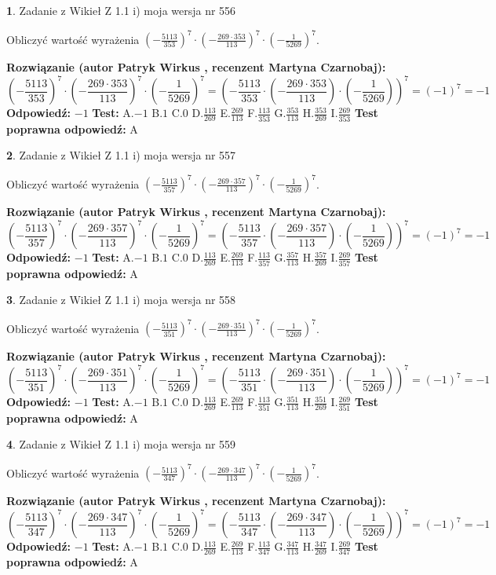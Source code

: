 \documentclass[12pt, a4paper]{article}
\theoremstyle{definition} %
\newtheorem{zad}{}
\newcommand{\zadStart}[1]{\begin{zad}#1\newline}
\newcommand{\zadStop}{\end{zad}}
\newcommand{\rozwStart}[2]{\noindent \textbf{Rozwiązanie (autor #1 , recenzent #2): }\newline}
\newcommand{\rozwStop}{\newline}
\newcommand{\odpStart}{\noindent \textbf{Odpowiedź:}\newline}
\newcommand{\odpStop}{\newline}
\newcommand{\testStart}{\noindent \textbf{Test:}\newline}
\newcommand{\testStop}{\newline}
\newcommand{\kluczStart}{\noindent \textbf{Test poprawna odpowiedź:}\newline}
\newcommand{\kluczStop}{\newline}
\begin{document}
\zadStart{Zadanie z Wikieł Z 1.1 i) moja wersja nr 556}

Obliczyć wartość wyrażenia $(-\frac{5113}{353})^{7} \cdot (-\frac{269 \cdot 353}{113})^{7} \cdot (-\frac{1}{5269})^{7}$.
\zadStop
\rozwStart{Patryk Wirkus}{Martyna Czarnobaj}
$$(-\frac{5113}{353})^{7} \cdot (-\frac{269 \cdot 353}{113})^{7} \cdot (-\frac{1}{5269})^{7} = (-\frac{5113}{353} \cdot (-\frac{269 \cdot 353}{113}) \cdot (-\frac{1}{5269}))^{7} = (-1)^{7} = -1$$
\rozwStop
\odpStart
$-1$
\odpStop
\testStart
A.$-1$ B.$1$ C.$0$ D.$\frac{113}{269}$ E.$\frac{269}{113}$
F.$\frac{113}{353}$ G.$\frac{353}{113}$
H.$\frac{353}{269}$
I.$\frac{269}{353}$
\testStop
\kluczStart
A
\kluczStop



\zadStart{Zadanie z Wikieł Z 1.1 i) moja wersja nr 557}

Obliczyć wartość wyrażenia $(-\frac{5113}{357})^{7} \cdot (-\frac{269 \cdot 357}{113})^{7} \cdot (-\frac{1}{5269})^{7}$.
\zadStop
\rozwStart{Patryk Wirkus}{Martyna Czarnobaj}
$$(-\frac{5113}{357})^{7} \cdot (-\frac{269 \cdot 357}{113})^{7} \cdot (-\frac{1}{5269})^{7} = (-\frac{5113}{357} \cdot (-\frac{269 \cdot 357}{113}) \cdot (-\frac{1}{5269}))^{7} = (-1)^{7} = -1$$
\rozwStop
\odpStart
$-1$
\odpStop
\testStart
A.$-1$ B.$1$ C.$0$ D.$\frac{113}{269}$ E.$\frac{269}{113}$
F.$\frac{113}{357}$ G.$\frac{357}{113}$
H.$\frac{357}{269}$
I.$\frac{269}{357}$
\testStop
\kluczStart
A
\kluczStop



\zadStart{Zadanie z Wikieł Z 1.1 i) moja wersja nr 558}

Obliczyć wartość wyrażenia $(-\frac{5113}{351})^{7} \cdot (-\frac{269 \cdot 351}{113})^{7} \cdot (-\frac{1}{5269})^{7}$.
\zadStop
\rozwStart{Patryk Wirkus}{Martyna Czarnobaj}
$$(-\frac{5113}{351})^{7} \cdot (-\frac{269 \cdot 351}{113})^{7} \cdot (-\frac{1}{5269})^{7} = (-\frac{5113}{351} \cdot (-\frac{269 \cdot 351}{113}) \cdot (-\frac{1}{5269}))^{7} = (-1)^{7} = -1$$
\rozwStop
\odpStart
$-1$
\odpStop
\testStart
A.$-1$ B.$1$ C.$0$ D.$\frac{113}{269}$ E.$\frac{269}{113}$
F.$\frac{113}{351}$ G.$\frac{351}{113}$
H.$\frac{351}{269}$
I.$\frac{269}{351}$
\testStop
\kluczStart
A
\kluczStop



\zadStart{Zadanie z Wikieł Z 1.1 i) moja wersja nr 559}

Obliczyć wartość wyrażenia $(-\frac{5113}{347})^{7} \cdot (-\frac{269 \cdot 347}{113})^{7} \cdot (-\frac{1}{5269})^{7}$.
\zadStop
\rozwStart{Patryk Wirkus}{Martyna Czarnobaj}
$$(-\frac{5113}{347})^{7} \cdot (-\frac{269 \cdot 347}{113})^{7} \cdot (-\frac{1}{5269})^{7} = (-\frac{5113}{347} \cdot (-\frac{269 \cdot 347}{113}) \cdot (-\frac{1}{5269}))^{7} = (-1)^{7} = -1$$
\rozwStop
\odpStart
$-1$
\odpStop
\testStart
A.$-1$ B.$1$ C.$0$ D.$\frac{113}{269}$ E.$\frac{269}{113}$
F.$\frac{113}{347}$ G.$\frac{347}{113}$
H.$\frac{347}{269}$
I.$\frac{269}{347}$
\testStop
\kluczStart
A
\kluczStop
\end{document}
